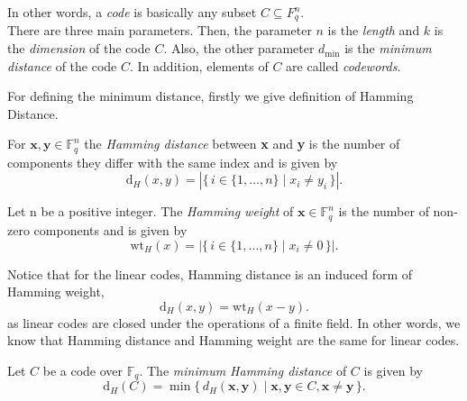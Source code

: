\noindent In other words, a \textit{code} is basically any subset $C \subseteq F_q^n$.
\\[0.4cm]
There are three main parameters. Then, the parameter $n$ is the \textit{length} and $k$ is the \textit{dimension} of the code $C$. Also, the other parameter $d_{\min}$ is the \textit{minimum distance} of the code $C$. In addition, elements of $C$ are called \textit{codewords}. 

For defining the minimum distance, firstly we give definition of Hamming Distance. 

\begin{definition}
For $\textbf{x}, \textbf{y} \in \mathbb F_q^n$ the \textit{Hamming distance} between \textbf{x} and \textbf{y} is the number of components they differ with the same index and is given by
\[
\mathrm{d}_H(x, y) =
\left| \{\, i \in \{1, \dots, n\} 
\mid x_i \neq y_i \,\} \right|.
\]    
\end{definition}

\begin{definition}
Let n be a positive integer. The \textit{Hamming weight} of 
$\textbf{x} \in \mathbb F_q^n$ is the number of non-zero components and is given by
\[
\mathrm{wt}_H(x) = 
\left| \{\, i \in \{1, \dots, n\} 
\mid x_i \neq 0 \,\} \right|.
\]
\end{definition}

\noindent Notice that for the linear codes, Hamming distance is an induced form of Hamming weight,
\[
\mathrm{d}_H(x, y) = \mathrm{wt}_H(x-y).
\]
as linear codes are closed under the operations of a finite field. In other words, we know that Hamming distance and Hamming weight are the same for linear codes.

\begin{definition}
Let $C$ be a code over $\mathbb F_q$. The \textit{minimum Hamming distance} of $C$ is given by
\[
\mathrm{d}_H(C) = 
\min\{\,d_H(\textbf{x}, \textbf{y}) \mid 
\textbf{x}, \textbf{y} \in C, \textbf{x} \neq \textbf{y} \,\}.
\]
\end{definition}

